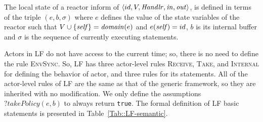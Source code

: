 The local state of a reactor inform of $\langle id, V, \mathit{Handlr}, \mathit{in}, \mathit{out}\rangle$, is defined in terms of the triple $(e,b, \sigma)$ where $e$ defines the value of the state variables of the reactor such that $V\cup\{\mathit{self}\}=\mathit{domain}(e)$ and $e(\mathit{self})=id$, $b$ is its internal buffer and $\sigma$ is the sequence of currently executing statements.

Actors in LF do not have access to the current time; so, there is no need to define the rule \textsc{EnvSync}. So, LF has three actor-level rules \textsc{Receive}, \textsc{Take}, and \textsc{Internal} for defining the behavior of actor, and three rules for its statements. All of the actor-level rules of LF are the same as that of the generic framework, so they are inherited with no modification. We only define the assumptions $\mathit{?takePolicy}(e,b)$ to always return \texttt{true}. The formal definition of LF basic statements is presented in Table~\ref{Tab::LF-semantic}.

\begin{comment}
\begin{itemize}
    \item this setting has the rule $\receive$ of the generic framework with no modification: 
$$\inferrule*[left = (receive)]{b\boverto{m?}b'}{(e,b, \sigma)\aoverto{m?}(e, b', \sigma)}$$

    \item In Lingua Franca, changing the value of an input port results in taking its corresponding message and calling its reactor as shown by the rule $\take$:

$$\inferrule*[left = (take)]{b\boverto{m!}b' \\ e'=e[m.port\mapsto m.value]}{(e,b,\epsilon)\aoverto{m}(e',b',\msgHandlr(m.name))}$$

We remark that the second condition of this rule addresses sequential execution of statements, corresponding to the taken message, which is defined as:

$$\inferrule*[left = (internal)]{e,\sigma \aoverto{\alpha}e', \sigma'}{(e,b,\sigma)\aoverto{\alpha}(e',b,\sigma')}$$

such that the statement-level rules are
$$\inferrule*[left = (set)]{e,(p_o,v) \overto{(e(\self),p_o,v,(0,0))}e,\top}{}$$
$$\inferrule*[left = (assignment)]{e,v:=expr \overto{\tau}e[v\mapsto \eval(\expr,e)],\top]}{}$$

and $\eval(\expr,e)$ is the value of the expression $\expr$ with respect to the environment $e$. 

\end{itemize}
The statement-level rules of LF are:
$$\inferrule*[left = (Set)]{e,(p_o,v) \stoverto{(e(\self),p_o,v,(0,0))!}e,\top}{}$$
$$\inferrule*[left = (Assignment)]{e,v:=expr \stoverto{\tau}e[v\mapsto \eval(\expr,e)],\top]}{}$$
$$\inferrule*[left = (SequentialComposition)]{e,\sigma_1\stoverto{\tau}e,\top}{e,\sigma_1;\sigma_2\stoverto{\tau}e,\sigma_2}$$
\end{comment}

